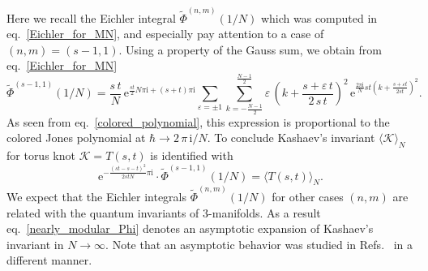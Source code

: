 \documentclass[12pt,reqno]{amsart}
\begin{document}
Here we recall  the Eichler integral
$\widetilde{\Phi}^{(n,m)}(1/N)$
which was computed in
eq.~\eqref{Eichler_for_MN},
and especially pay attention to 
a case of $(n,m)=(s-1, 1)$.
Using a property of the Gauss sum,
we  obtain  from eq.~\eqref{Eichler_for_MN}
\begin{equation}
  \widetilde{\Phi}^{(s-1,1)}(1/N)
  =
  \frac{s \, t}{N} \,
  \mathrm{e}^{
    \frac{s t}{2} N \pi \mathrm{i} + (s+t)
    \pi \mathrm{i}
  }
  \sum_{\varepsilon=\pm 1}
  \sum_{k=-\frac{N-1}{2}}^{\frac{N-1}{2}}
  \varepsilon \,
  \left(
    k+ \frac{s + \varepsilon \, t}{2 \, s \, t}
  \right)^2 \,
  \mathrm{e}^{
    \frac{2 \pi \mathrm{i}}{N} s t
    \left( k + \frac{s + \varepsilon t}{2 s t} \right)^2
  } .
\end{equation}
As seen from eq.~\eqref{colored_polynomial}, this expression is
proportional to 
the colored Jones polynomial at 
$\hbar \to 2 \, \pi \, \mathrm{i}/N$.
To conclude
Kashaev's invariant
$\langle \mathcal{K} \rangle_N$
for torus knot $\mathcal{K}=T(s,t)$
is identified with
\begin{equation}
  \label{invariant_character}
  \mathrm{e}^{-\frac{(s t - s - t)^2}{2 s t N} \pi \mathrm{i}}
  \cdot
  \widetilde{\Phi}^{(s-1,1)}(1/N)
  =
  \langle T(s,t) \rangle_N .
\end{equation}
We expect that
the Eichler integrals $\widetilde{\Phi}^{(n,m)}(1/N)$ for
other cases $(n,m)$ are related with the quantum
invariants of 3-manifolds.
As a result
eq.~\eqref{nearly_modular_Phi} denotes an asymptotic expansion of
Kashaev's invariant in $N\to\infty$.
Note that an asymptotic behavior  was studied in
Refs.~ in a different manner.
\end{document}
